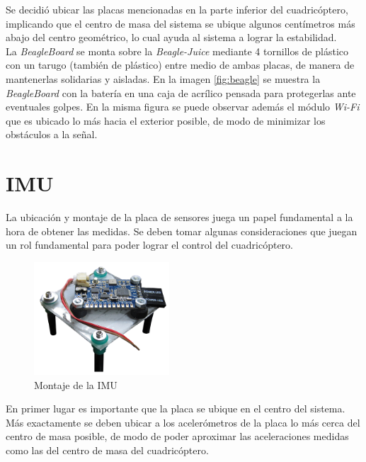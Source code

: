 \documentclass[main]{subfiles}
\begin{document}
Se decidió ubicar las placas mencionadas en la parte inferior del cuadricóptero, implicando que el centro de masa del sistema se ubique algunos centímetros más abajo del centro geométrico, lo cual ayuda al sistema a lograr la estabilidad.\\

La \emph{BeagleBoard} se monta sobre la \emph{Beagle-Juice} mediante 4 tornillos de plástico con un tarugo (también de plástico) entre medio de ambas placas, de manera de mantenerlas solidarias y aisladas. En la imagen \ref{fig:beagle} se muestra la \emph{BeagleBoard} con la batería en una caja de acrílico pensada para protegerlas ante eventuales golpes. En la misma figura se puede observar además el módulo \emph{Wi-Fi} que es ubicado lo más hacia el exterior posible, de modo de minimizar los obstáculos a la señal.

\section{IMU}

La ubicación y montaje de la placa de sensores juega un papel fundamental a la hora de obtener las medidas. Se deben tomar algunas consideraciones que juegan un rol fundamental para poder lograr el control del cuadricóptero.\\

\begin{figure}
	\begin{center}
		\includegraphics[width=0.45\textwidth]{./pics_montaje/imu.jpg}
	\end{center}
	\caption{Montaje de la IMU}
	\label{fig:imu}
\end{figure}

En primer lugar es importante que la placa se ubique en el centro del sistema. Más exactamente se deben ubicar a los acelerómetros de la placa lo más cerca del centro de masa posible, de modo de poder aproximar las aceleraciones medidas como las del centro de masa del cuadricóptero.\\
\end{document}
